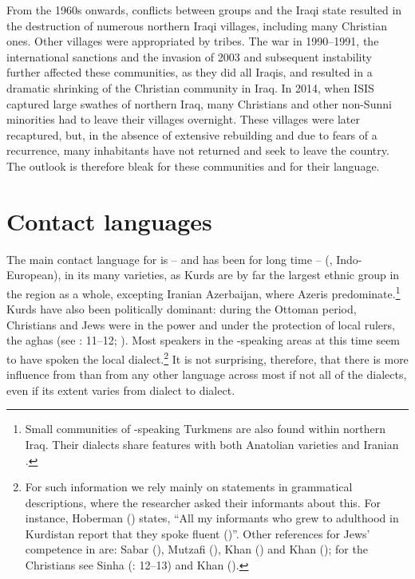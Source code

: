 \documentclass[output=paper]{langsci/langscibook}
\begin{document}
From the 1960s onwards, conflicts between  groups and the Iraqi state resulted in the destruction of numerous northern Iraqi villages, including many Christian ones. Other villages were appropriated by  tribes. The war in 1990–1991, the international sanctions and the invasion of 2003 and subsequent instability further affected these communities, as they did all Iraqis, and resulted in a dramatic shrinking of the Christian community in Iraq. In 2014, when ISIS captured large swathes of northern Iraq, many {Christians} and other non-Sunni minorities had to leave their villages overnight. These villages were later recaptured, but, in the absence of extensive rebuilding and due to fears of a recurrence, many inhabitants have not returned and seek to leave the country. The outlook is therefore bleak for these communities and for their language.

\section{\label{bkm:Ref534214034}Contact languages}

The main contact language for  is – and has been for long time –  (, Indo-European), in its many varieties, as {Kurds} are by far the largest ethnic group in the region as a whole, excepting Iranian Azerbaijan, where Azeris predominate.\footnote{Small communities of -speaking Turkmens are also found within northern Iraq. Their dialects share features with both Anatolian  varieties and Iranian  \citep{Bulut2007}.} {Kurds} have also been politically dominant: during the Ottoman period, {Christians} and {Jews} were in the power and under the protection of local  rulers, the aghas (see \citealt{Sinha2000}: 11–12; \citealt[223]{BrauerPatai1993}). Most  speakers in the -speaking areas at this time seem to have spoken the local  dialect.\footnote{For such information we rely mainly on statements in grammatical descriptions, where the researcher asked their informants about this. For instance, Hoberman (\citeyear[9]{Hoberman1989}) states, ``All my informants who grew to adulthood in Kurdistan report that they spoke fluent  ()''. Other references for {Jews}’ competence in  are: Sabar (\citeyear[216]{Sabar1978}), Mutzafi (\citeyear[5]{Mutzafi2004}), Khan (\citeyear[198]{Khan2007}) and Khan (\citeyear[11]{Khan2009}); for the {Christians} see Sinha (\citeyear{Sinha2000}: 12–13) and Khan (\citeyear[18]{Khan2008}).} It is not surprising, therefore, that there is more influence from  than from any other language across most if not all of the  dialects, even if its extent varies from dialect to dialect.
\end{document}

